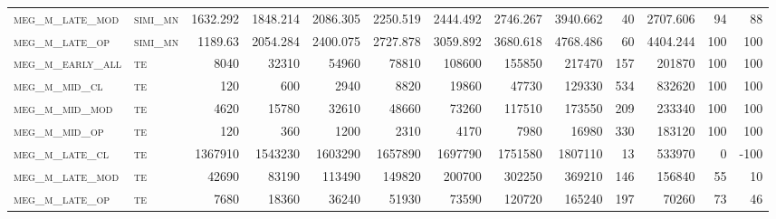 \begin{landscape}
\begin{center}
\begin{footnotesize}
\begin{longtable}{llrrrrrrrr|rrr}
\textsc{meg\_m\_late\_mod } & \textsc{simi\_mn  }   & 1632.292 & 1848.214 & 2086.305 & 2250.519 & 2444.492 & 2746.267 & 3940.662  & 40     & 2707.606      & 94            & 88              \\
\textsc{meg\_m\_late\_op  } & \textsc{simi\_mn  }   & 1189.63  & 2054.284 & 2400.075 & 2727.878 & 3059.892 & 3680.618 & 4768.486  & 60     & 4404.244      & 100           & 100             \\%
\textsc{meg\_m\_early\_all} & \textsc{te  		}   & 8040     & 32310    & 54960    & 78810    & 108600   & 155850   & 217470    & 157    & 201870        & 100           & 100             \\
\textsc{meg\_m\_mid\_cl   } & \textsc{te  		}   & 120      & 600      & 2940     & 8820     & 19860    & 47730    & 129330    & 534    & 832620        & 100           & 100             \\
\textsc{meg\_m\_mid\_mod  } & \textsc{te 		}   & 4620     & 15780    & 32610    & 48660    & 73260    & 117510   & 173550    & 209    & 233340        & 100           & 100             \\
\textsc{meg\_m\_mid\_op   } & \textsc{te 		}   & 120      & 360      & 1200     & 2310     & 4170     & 7980     & 16980     & 330    & 183120        & 100           & 100             \\
\textsc{meg\_m\_late\_cl  } & \textsc{te 		}   & 1367910  & 1543230  & 1603290  & 1657890  & 1697790  & 1751580  & 1807110   & 13     & 533970        & 0             & -100            \\
\textsc{meg\_m\_late\_mod } & \textsc{te 		}   & 42690    & 83190    & 113490   & 149820   & 200700   & 302250   & 369210    & 146    & 156840        & 55            & 10              \\
\textsc{meg\_m\_late\_op  } & \textsc{te 		}   & 7680     & 18360    & 36240    & 51930    & 73590    & 120720   & 165240    & 197    & 70260         & 73            & 46             %

\end{longtable}
\end{footnotesize}
\end{center}
\end{landscape}

\restoregeometry
\pagestyle{headings}


